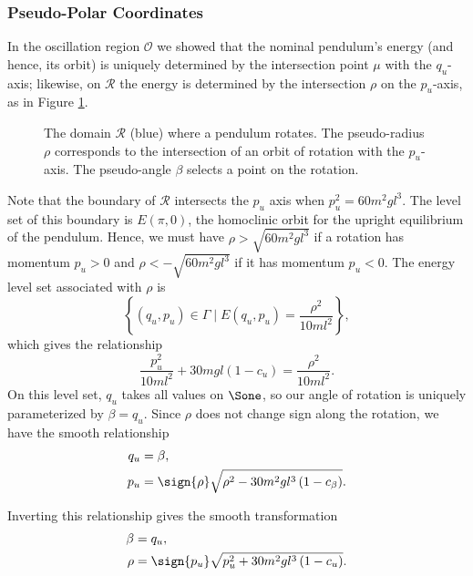 \subsubsection*{Pseudo-Polar Coordinates}

In the oscillation region \(\mathcal{O}\) we showed that the nominal pendulum's
energy (and hence, its orbit) is uniquely determined by the intersection point
\(\mu\) with the \(q_u\)-axis;
likewise, on \(\mathcal{R}\) the energy is determined by the intersection
\(\rho\) on the \(p_u\)-axis, as in Figure \ref{fig:rho-intersection}.

\begin{figure}
    \centering
    
    \caption{The domain \(\mathcal{R}\) (blue) where a pendulum rotates. The
        pseudo-radius \(\rho\) corresponds to the intersection of an orbit of
        rotation with the \(p_u\)-axis. The pseudo-angle \(\beta\) selects a
        point on the rotation.}
    \label{fig:rho-intersection}
\end{figure}

Note that the boundary of \(\mathcal{R}\) intersects the \(p_u\) axis when 
\(p_u^2 = 60m^2 g l^3\). 
The level set of this boundary is \(E(\pi,0)\), the homoclinic orbit for the
upright equilibrium of the pendulum.
Hence, we must have \(\rho > \sqrt{60 m^2 g l^3}\) if a
rotation has momentum \(p_u > 0\) 
and \(\rho < -\sqrt{60 m^2 g l^3}\) if it has momentum \(p_u < 0\).
The energy level set associated with \(\rho\) is 
\[
    \left\{(q_u,p_u) \in \Gamma \mid E(q_u,p_u) = \frac{\rho^2}{10ml^2}\right\}
    ,
\]
which gives the relationship
\begin{equation}\label{eqn:rotation-pu2}
    \frac{p_u^2}{10m l^2} + 30mgl(1 - c_u) = \frac{\rho^2}{10 ml^2}
    .
\end{equation}
On this level set, \(q_u\) takes all values on \(\Sone\), so our angle of
rotation is uniquely parameterized by \(\beta = q_u\).
Since \(\rho\) does not change sign along the rotation, we have the smooth
relationship
\begin{align}\label{eqn:rotation-Tinv}
    q_u &= \beta
    , \\
    p_u &= \sign{\rho}\sqrt{\rho^2 - 30 m^2 g l^3\left(1 - c_\beta \right)}
    .
\end{align}

Inverting this relationship gives the smooth transformation
\begin{align}\label{eqn:rotation-T}
    \beta &= q_u
    , \\
    \rho &= \sign{p_u}\sqrt{p_u^2 + 30 m^2 g l^3 \left(1 - c_u \right)}
    .
\end{align}

